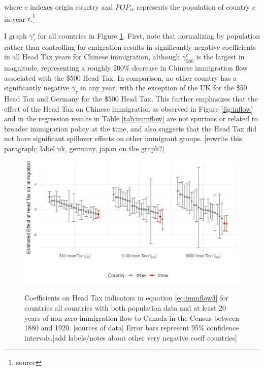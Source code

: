 where $c$ indexes origin country and $POP_{ct}$ represents the population of country $c$ in year $t$.\footnote{source}

I graph $\gamma^c_{\tau}$ for all countries in Figure \ref{fig:gammac}. First, note that normalizing by population rather than controlling for emigration results in significantly negative coefficients in all Head Tax years for Chinese immigration, although $\gamma_{500}^c$ is the largest in magnitude, representing a roughly 200\% decrease in Chinese immigration flow associated with the \$500 Head Tax. In comparison, no other country has a significantly negative $\gamma_{\tau}$ in any year, with the exception of the UK for the \$50 Head Tax and Germany for the \$500 Head Tax. This further emphasizes that the effect of the Head Tax on Chinese immigration as observed in Figure \ref{fig:inflow} and in the regression results in Table \ref{tab:immflow} are not spurious or related to broader immigration policy at the time, and also suggests that the Head Tax did not have significant spillover effects on other immigrant groups. [rewrite this paragraph; label uk, germany, japan on the graph?] 

\begin{figure}[h!]
    \centering 
    \caption{Coefficients on Head Tax indicators in equation \ref{eq:immflow3} for countries all countries with both population data and at least 20 years of non-zero immigration flow to Canada in the Census between 1880 and 1920. [sources of data] Error bars represent 95\% confidence intervals.[add labels/notes about other very negative coeff countries]}
    \includegraphics[width=\textwidth]{../../figs/immflow_countries.png}
    \label{fig:gammac}
\end{figure}
